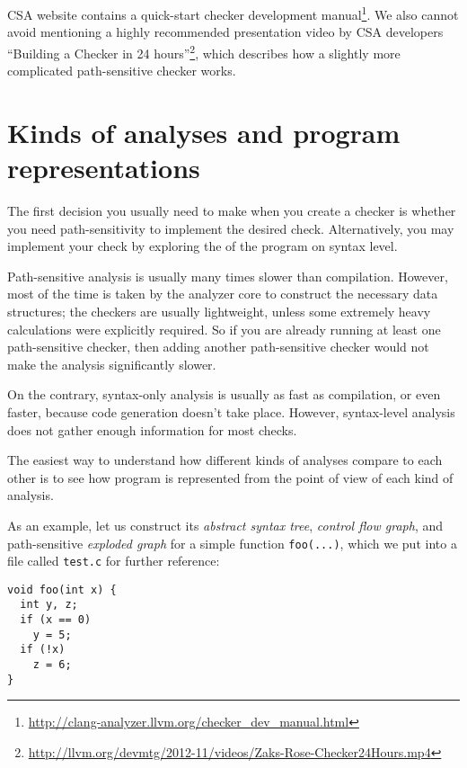 \documentclass[a4paper,12pt]{article}
\newenvironment{nobr}{\begin{minipage}{\textwidth}\setlength\parskip{1em}
}{\end{minipage}\ignorespacesafterend}
\begin{document}
CSA website contains a quick-start checker development manual\footnote{\url{http://clang-analyzer.llvm.org/checker_dev_manual.html}}. We also cannot avoid mentioning a highly recommended presentation video by CSA developers ``Building a Checker in 24 hours''\footnote{\url{http://llvm.org/devmtg/2012-11/videos/Zaks-Rose-Checker24Hours.mp4}}, which describes how a slightly more complicated path-sensitive checker works.

\newpage
\section{Kinds of analyses and program representations}\label{sec:data_structures}

The first decision you usually need to make when you create a checker is whether you need path-sensitivity to implement the desired check. Alternatively, you may implement your check by exploring the of the program on syntax level.

Path-sensitive analysis is usually many times slower than compilation. However, most of the time is taken by the analyzer core to construct the necessary data structures; the checkers are usually lightweight, unless some extremely heavy calculations were explicitly required. So if you are already running at least one path-sensitive checker, then adding another path-sensitive checker would not make the analysis significantly slower.

On the contrary, syntax-only analysis is usually as fast as compilation, or even faster, because code generation doesn't take place. However, syntax-level analysis does not gather enough information for most checks.

The easiest way to understand how different kinds of analyses compare to each other is to see how program is represented from the point of view of each kind of analysis.

\begin{nobr}
As an example, let us construct its \emph{abstract syntax tree}, \emph{control flow graph}, and path-sensitive \emph{exploded graph} for a simple function \lstinline|foo(...)|, which we put into a file called \lstinline|test.c| for further reference:

\begin{lstlisting}[style=cplusplus,title=\lstinline|test.c|]
void foo(int x) {
  int y, z;
  if (x == 0)
    y = 5;
  if (!x)
    z = 6;
}
\end{lstlisting}
\end{nobr}
\end{document}
